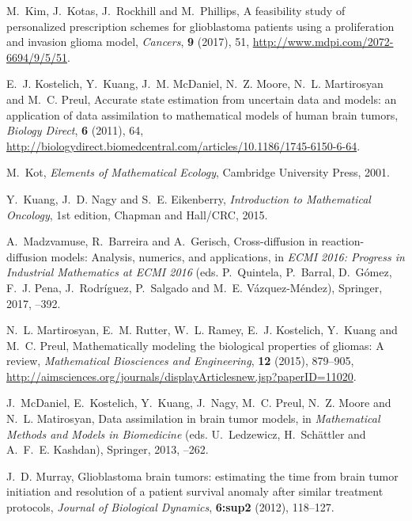 \documentclass{aims}
\numberwithin{equation}{section}
\begin{document}
\begin{thebibliography}{10}
\newblock M.~Kim, J.~Kotas, J.~Rockhill and M.~Phillips,
\newblock A feasibility study of personalized prescription schemes for
  glioblastoma patients using a proliferation and invasion glioma model,
\newblock \emph{Cancers}, \textbf{9} (2017), 51,
\newblock \urlprefix\url{http://www.mdpi.com/2072-6694/9/5/51}.

\newblock E.~J. Kostelich, Y.~Kuang, J.~M. McDaniel, N.~Z. Moore, N.~L.
  Martirosyan and M.~C. Preul,
\newblock Accurate state estimation from uncertain data and models: an
  application of data assimilation to mathematical models of human brain
  tumors,
\newblock \emph{Biology Direct}, \textbf{6} (2011), 64,
\newblock
  \urlprefix\url{http://biologydirect.biomedcentral.com/articles/10.1186/1745-6150-6-64}.

\newblock M.~Kot,
\newblock \emph{Elements of Mathematical Ecology},
\newblock Cambridge University Press, 2001.

\newblock Y.~Kuang, J.~D. Nagy and S.~E. Eikenberry,
\newblock \emph{Introduction to Mathematical Oncology},
\newblock 1st edition,
\newblock Chapman and Hall/CRC, 2015.

\newblock A.~Madzvamuse, R.~Barreira and A.~Gerisch,
\newblock Cross-diffusion in reaction-diffusion models: Analysis, numerics, and
  applications,
\newblock in \emph{ECMI 2016: Progress in Industrial Mathematics at ECMI 2016}
  (eds. P.~Quintela, P.~Barral, D.~Gómez, F.~J. Pena, J.~Rodríguez,
  P.~Salgado and M.~E. Vázquez-Méndez),
\newblock Springer, 2017,
--392.

\newblock N.~L. Martirosyan, E.~M. Rutter, W.~L. Ramey, E.~J. Kostelich,
  Y.~Kuang and M.~C. Preul,
\newblock Mathematically modeling the biological properties of gliomas: A
  review,
\newblock \emph{Mathematical Biosciences and Engineering}, \textbf{12} (2015),
  879--905,
\newblock
  \urlprefix\url{http://aimsciences.org/journals/displayArticlesnew.jsp?paperID=11020}.

\newblock J.~McDaniel, E.~Kostelich, Y.~Kuang, J.~Nagy, M.~C. Preul, N.~Z.
  Moore and N.~L. Matirosyan,
\newblock Data assimilation in brain tumor models,
\newblock in \emph{Mathematical Methods and Models in Biomedicine} (eds.
  U.~Ledzewicz, H.~Schättler and A.~F.~E. Kashdan),
\newblock Springer, 2013,
--262.

\newblock J.~D. Murray,
\newblock Glioblastoma brain tumors: estimating the time from brain tumor
  initiation and resolution of a patient survival anomaly after similar
  treatment protocols,
\newblock \emph{Journal of Biological Dynamics}, \textbf{6:sup2} (2012),
  118--127.


\end{thebibliography}
\end{document}
